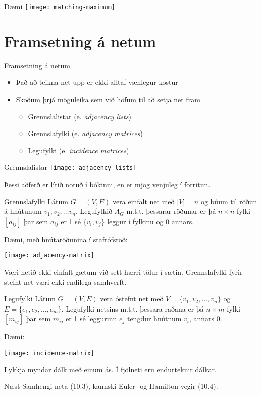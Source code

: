 \documentclass{beamer}
\begin{document}
\begin{frame}{Dæmi}
\texttt{[image: matching-maximum]}
\end{frame}

\section{Framsetning á netum}

\begin{frame}{Framsetning á netum}
\begin{itemize}
 \item Það að teikna net upp er ekki alltaf vænlegur kostur
 \item Skoðum þrjá möguleika sem við höfum til að setja net fram
 \begin{itemize}
  \item Grennslalistar (e. \emph{adjacency lists})
  \item Grennslafylki (e. \emph{adjacency matrices})
  \item Legufylki (e. \emph{incidence matrices})
 \end{itemize}
\end{itemize}
\end{frame}

\begin{frame}{Grennslalistar}
\texttt{[image: adjacency-lists]}

Þessi aðferð er lítið notuð í bókinni, en er mjög venjuleg í forritun.
\end{frame}

\begin{frame}{Grennslafylki}
Látum $G = (V, E)$ vera einfalt net með $|V| = n$ og búum til röðun á hnútunum $v_1, v_2, \ldots v_n$. Legufylkið $A_G$ m.t.t. þessarar röðunar er þá $n \times n$ fylki $[a_{ij}]$ þar sem $a_{ij}$ er 1 sé $\{v_i,v_j\}$ leggur í fylkinu og 0 annars.

Dæmi, með hnútaröðunina í stafrófsröð:
\begin{center}
\texttt{[image: adjacency-matrix]}
\end{center}
Væri netið ekki einfalt gætum við sett hærri tölur í sætin. Grennslafylki fyrir stefnt net væri ekki endilega samhverft.
\end{frame}

\begin{frame}{Legufylki}
Látum $G = (V, E)$ vera óstefnt net með $V = \{v_1, v_2, \ldots, v_n\}$ og $E = \{e_1, e_2, \ldots, e_m\}$. Legufylki netsins m.t.t. þessara raðana er þá $n \times m$ fylki $[m_{ij}]$ þar sem $m_{ij}$ er 1 sé leggurinn $e_j$ tengdur hnútnum $v_i$, annars 0.

Dæmi:
\begin{center}
\texttt{[image: incidence-matrix]}
\end{center}
Lykkja myndar dálk með einum ás. Í fjölneti eru endurteknir dálkar.
\end{frame}

\begin{frame}{Næst}
Samhengi neta (10.3), kannski Euler- og Hamilton vegir (10.4).
\end{frame}
\end{document}
